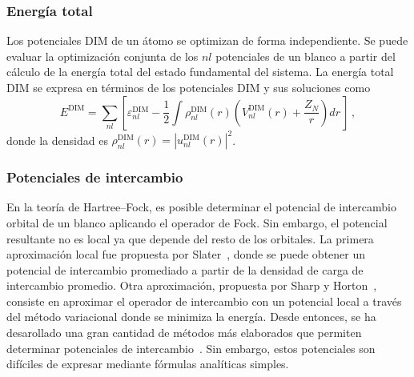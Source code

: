 \subsubsection*{Energía total}

Los potenciales DIM de un átomo se optimizan de forma independiente. Se 
puede evaluar la optimización conjunta de los $nl$ potenciales de un 
blanco a partir del cálculo de la energía total del estado fundamental 
del sistema. La energía total DIM se expresa en términos de los 
potenciales DIM y sus soluciones como
\begin{equation}
E^{\mathrm{DIM}} = \sum\limits_{nl} 
\left[ 
\varepsilon_{nl}^{\mathrm{DIM}} - 
\frac{1}{2}\int  \rho_{nl}^{\mathrm{DIM}}(r)
\left( V_{nl}^{\mathrm{DIM}}(r) + \frac{Z_{N}}{r}\right) dr \,
\right] \, ,
\label{eq:Etotal}
\end{equation}
donde la densidad es 
$\rho_{nl}^{\mathrm{DIM}}(r)=|u_{nl}^{\mathrm{DIM}}(r)|^2$. 


\subsubsection*{Potenciales de intercambio}

En la teoría de Hartree--Fock, es posible determinar el potencial de 
intercambio orbital de un blanco aplicando el operador de Fock. Sin 
embargo, el potencial resultante no es local ya que depende del resto de 
los orbitales. La primera aproximación local fue propuesta por 
Slater~\cite{Slater:51}, donde se puede obtener un potencial de 
intercambio promediado a partir de la densidad de carga de intercambio 
promedio. Otra aproximación, propuesta por Sharp y 
Horton~\cite{Sharp:53}, consiste en aproximar el operador de intercambio 
con un potencial local a través del método variacional donde se minimiza 
la energía. Desde entonces, se ha desarollado una gran cantidad de 
métodos más elaborados que permiten determinar potenciales de 
intercambio~\cite{Krieger:92,Gorling:92,Yang:02,Staroverov:06,
Ryabinkin:13}. Sin embargo, estos potenciales son difíciles de expresar 
mediante fórmulas analíticas simples.

